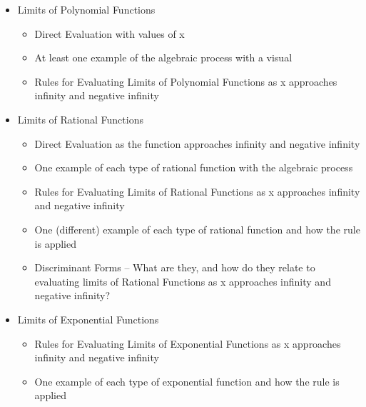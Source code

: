 \documentclass{article}
\begin{document}
\begin{itemize}
\item Limits of Polynomial Functions
  \begin{itemize}
    \item Direct Evaluation with values of x
    \item At least one example of the algebraic process with a visual
    \item Rules for Evaluating Limits of Polynomial Functions as x approaches infinity and negative infinity
  \end{itemize}

\item Limits of Rational Functions
  \begin{itemize}
    \item Direct Evaluation as the function approaches infinity and negative infinity
    \item One example of each type of rational function with the algebraic process
    \item Rules for Evaluating Limits of Rational Functions as x approaches infinity and negative infinity
    \item One (different) example of each type of rational function and how the rule is applied
    \item Discriminant Forms -- What are they, and how do they relate to evaluating limits of Rational Functions as x approaches infinity and negative infinity?
  \end{itemize}

\item Limits of Exponential Functions
  \begin{itemize}
    \item Rules for Evaluating Limits of Exponential Functions as x approaches infinity and negative infinity
    \item One example of each type of exponential function and how the rule is applied
  \end{itemize}
\end{itemize}
\end{document}
